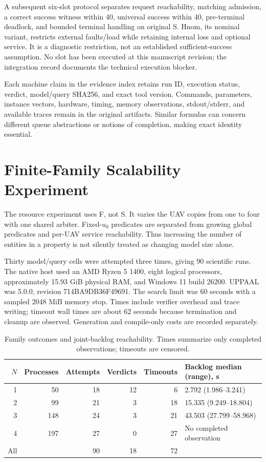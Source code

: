 \documentclass[runningheads]{llncs}
\begin{document}
A subsequent six-slot protocol separates request reachability, matching admission, a correct success witness within 40, universal success within 40, pre-terminal deadlock, and bounded terminal handling on original S. Hnom, its nominal variant, restricts external faults/load while retaining internal loss and optional service. It is a diagnostic restriction, not an established sufficient-success assumption. No slot has been executed at this manuscript revision; the integration record documents the technical execution blocker.

Each machine claim in the evidence index retains run ID, execution status, verdict, model/query SHA256, and exact tool version. Commands, parameters, instance vectors, hardware, timing, memory observations, stdout/stderr, and available traces remain in the original artifacts. Similar formulas can concern different queue abstractions or notions of completion, making exact identity essential.

\section{Finite-Family Scalability Experiment}\label{sec:scalability}
The resource experiment uses F, not S. It varies the UAV copies from one to four with one shared arbiter. Fixed-$u_0$ predicates are separated from growing global predicates and per-UAV service reachability. Thus increasing the number of entities in a property is not silently treated as changing model size alone.

Thirty model/query cells were attempted three times, giving 90 scientific runs. The native host used an AMD Ryzen 5 1400, eight logical processors, approximately 15.93 GiB physical RAM, and Windows 11 build 26200. UPPAAL was 5.0.0, revision 714BA9DB36F49691. The search limit was 60 seconds with a sampled 2048 MiB memory stop. Times include verifier overhead and trace writing; timeout wall times are about 62 seconds because termination and cleanup are observed. Generation and compile-only costs are recorded separately.

\begin{table}[t]
\caption{Family outcomes and joint-backlog reachability. Times summarize only completed observations; timeouts are censored.}\label{tab:scalability}
\centering\small
\begin{tabular}{@{}rrrrrl@{}}
\toprule $N$ & Processes & Attempts & Verdicts & Timeouts & Backlog median (range), s\\\midrule
1 & 50 & 18 & 12 & 6 & 2.792 (1.986--3.241)\\
2 & 99 & 21 & 3 & 18 & 15.335 (9.249--18.804)\\
3 & 148 & 24 & 3 & 21 & 43.503 (27.799--58.968)\\
4 & 197 & 27 & 0 & 27 & No completed observation\\\midrule
All & & 90 & 18 & 72 &\\\bottomrule
\end{tabular}
\end{table}
\end{document}
